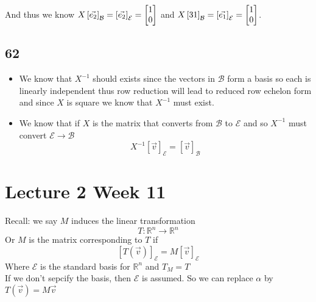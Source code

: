 \documentclass[11pt]{book}
\begin{document}
And thus we know $X\left[ \vec{e_2}  \right]_{\mathcal{B}} = \left[ \vec{e_2}  \right]_{\mathcal{E}} = \begin{bmatrix} 1 \\ 0 \end{bmatrix} $ and $X\left[ 31 \right]_{\mathcal{B}} = \left[ \vec{e_1}  \right]_{\mathcal{E}} = \begin{bmatrix} 1 \\ 0 \end{bmatrix} $. 


\subsection*{62}%
\label{sub:62}

\begin{itemize}
    \item We know that  $X^{-1} $ should exists since the vectors in $\mathcal{B} $ form a basis so each is linearly independent thus row reduction will lead to reduced row echelon form and since $X$ is square we know that $X^{-1} $ must exist. 
    \item We know that if $X$ is the matrix that converts from $\mathcal{B} $ to $\mathcal{E} $ and so $X^{-1} $ must convert $\mathcal{E} \to \mathcal{B}$  
        \[
        X^{-1} \left[ \vec{v}  \right]_{\mathcal{E}} = \left[ \vec{v}  \right]_{\mathcal{B}} 
        \]

\end{itemize}



\section{Lecture 2 Week 11}%
\label{sec:lecture_2_week_11}

Recall: we say $M$ induces the linear transformation 
\[
T : \mathbb{R} ^{n}  \to \mathbb{R} ^{n}  \tag{$\alpha $}
\]
Or $M$ is the matrix corresponding to $T$ if 
\[
\left[ T\left(\vec{v} \right) \right]_{\mathcal{E}} = M\left[ \vec{v}  \right]_{\mathcal{E}} 
\]
Where $\mathcal{E} $ is the standard basis for $\mathbb{R} ^{n} $ and $T_{M} = T$ \\
If we don't sepcify the basis, then $\mathcal{E} $ is assumed. So we can replace $\alpha $  by $T\left(\vec{v} \right)= M\vec{v} $ 
\end{document}
